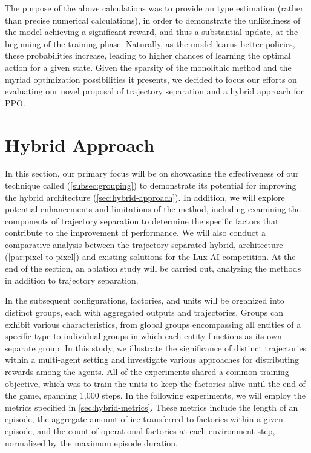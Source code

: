 \bigskip

\noindent The purpose of the above calculations was to provide an  type estimation (rather than precise numerical calculations), in order to demonstrate the unlikeliness of the model achieving a significant reward, and thus a substantial update, at the beginning of the training phase. Naturally, as the model learns better policies, these probabilities increase, leading to higher chances of learning the optimal action for a given state. Given the sparsity of the monolithic method and the myriad optimization possibilities it presents, we decided to focus our efforts on evaluating our novel proposal of trajectory separation and a hybrid approach for PPO.

\bigskip

\section{Hybrid Approach}
\label{sec:hybrid-approach-results}

\noindent In this section, our primary focus will be on showcasing the effectiveness of our technique called  (\autoref{subsec:grouping}) to demonstrate its potential for improving the hybrid architecture (\autoref{sec:hybrid-approach}). In addition, we will explore potential enhancements and limitations of the method, including examining the components of trajectory separation to determine the specific factors that contribute to the improvement of performance. We will also conduct a comparative analysis between the trajectory-separated hybrid,  architecture (\autoref{par:pixel-to-pixel}) and existing solutions for the Lux AI competition. At the end of the section, an ablation study will be carried out, analyzing the methods in addition to trajectory separation.

\bigskip

\noindent In the subsequent configurations, factories, and units will be organized into distinct groups, each with aggregated outputs and trajectories. Groups can exhibit various characteristics, from global groups encompassing all entities of a specific type to individual groups in which each entity functions as its own separate group. In this study, we illustrate the significance of distinct trajectories within a multi-agent setting and investigate various approaches for distributing rewards among the agents. All of the experiments shared a common training objective, which was to train the units to keep the factories alive until the end of the game, spanning 1,000 steps. In the following experiments, we will employ the metrics specified in \autoref{sec:hybrid-metrics}. These metrics include the length of an episode, the aggregate amount of ice transferred to factories within a given episode, and the count of operational factories at each environment step, normalized by the maximum episode duration.

